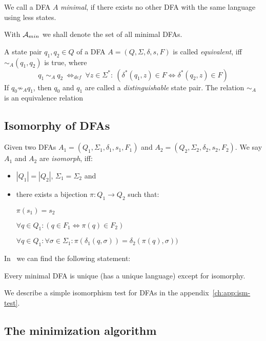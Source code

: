 \begin{definition}
	We call a DFA $A$ \emph{minimal}, if there exists no other DFA with the same language using less states.
\end{definition}
\noindent With ${\mathcal{A}_{min}}$ we shall denote the set of all minimal DFAs.

\begin{definition}\cite[p. 154]{HMU01}\label{ch:2:def:eq-dist-pairs}
	A state pair $q_1, q_2 \in Q$ of a DFA $A = (Q, \Sigma, \delta, s, F)$ is called \emph{equivalent}, iff $\sim_A(q_1, q_2)$ is true, where
	\begin{displaymath}
	q_1\ \sim_A\ q_2\ \Leftrightarrow_{def}\ \forall z \in \Sigma^* \colon\ (\delta^*(q_1, z) \in F \Leftrightarrow \delta^*(q_2, z) \in F)
	\end{displaymath}
	If $q_0 \not\sim_A q_1$, then $q_0$ and $q_1$ are called a \emph{distinguishable} state pair. The relation $\sim_A$ is an equivalence relation
\end{definition}

\subsection{Isomorphy of DFAs}\label{ch:2:sec:isom}

Given two DFAs $A_1 = (Q_1, \Sigma_1, \delta_1, s_1, F_1)$ and $A_2 = (Q_2, \Sigma_2, \delta_2, s_2, F_2)$. We say $A_1$ and $A_2$ are \emph{isomorph}, iff:
\begin{itemize}
	\item $|Q_1| = |Q_2|$, $\Sigma_1 = \Sigma_2$ and
	\item there exists a bijection $\pi\colon Q_1 \to Q_2$ such that:
	
	$\pi(s_1) = s_2$
	
	$\forall q\in Q_1\colon (q\in F_1 \Longleftrightarrow \pi(q)\in F_2)$
	
	$\forall q\in Q_1\colon \forall\sigma\in\Sigma_1\colon \pi(\delta_1(q,\sigma))=\delta_2(\pi(q),\sigma))$
\end{itemize}
In~\cite[p. 45]{Sch01} we can find the following statement:
\begin{theorem}\label{ch:2:thm:uniq-ism}
	Every minimal DFA is unique (has a unique language) except for isomorphy.
\end{theorem}
\noindent We describe a simple isomorphism test for DFAs in the appendix~\ref{ch:app:ism-test}.

\subsection{The minimization algorithm}


